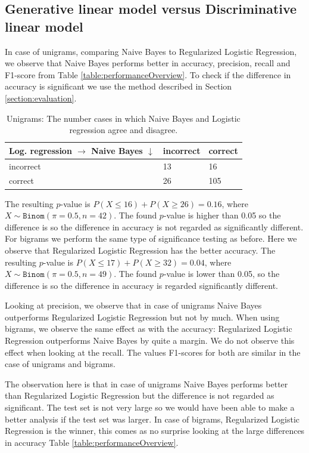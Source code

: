 \documentclass[a4paper,11pt]{article}
\begin{document}
\subsection{Generative linear model versus Discriminative linear model}
In case of unigrams, comparing Naive Bayes to Regularized Logistic Regression, we observe that Naive Bayes performs better in accuracy, precision, recall and F1-score from Table \ref{table:performanceOverview}. To check if the difference in accuracy is significant we use the method described in Section \ref{section:evaluation}. 
\begin{table}[H]
\centering
\caption{Unigrams: The number cases in which Naive Bayes and Logistic regression agree and disagree.}
\label{table:NBLogUni}
\begin{tabular}{|l|l|l|}
\hline
\shortstack{Log. regression $\rightarrow$ \\ Naive Bayes $\downarrow$} & incorrect & correct \\
\hline
incorrect   & 13   & 16    \\
correct & 26   & 105     \\
\hline
\end{tabular}
\end{table}
The resulting $p$-value is $P(X \leq 16) + P(X \geq 26) = 0.16$, where $X \sim \texttt{Binom}(\pi = 0.5, n = 42)$. The found $p$-value is higher than 0.05 so the difference is so the difference in accuracy is not regarded as significantly different. For bigrams we perform the same type of significance testing as before. Here we observe that Regularized Logistic Regression has the better accuracy. The resulting $p$-value is $P(X \leq 17) + P(X \geq 32) = 0.04$, where $X \sim \texttt{Binom}(\pi = 0.5, n = 49)$. The found $p$-value is lower than 0.05, so the difference is so the difference in accuracy is regarded significantly different. 

Looking at precision, we observe that in case of unigrams Naive Bayes outperforms Regularized Logistic Regression but not by much. When using bigrams, we observe the same effect as with the accuracy: Regularized Logistic Regression outperforms Naive Bayes by quite a margin. We do not observe this effect when looking at the recall. The values F1-scores for both are similar in the case of unigrams and bigrams. 

The observation here is that in case of unigrams Naive Bayes performs better than Regularized Logistic Regression but the difference is not regarded as significant. The test set is not very large so we would have been able to make a better analysis if the test set was larger. In case of bigrams, Regularized Logistic Regression is the winner, this comes as no surprise looking at the large differences in accuracy Table \ref{table:performanceOverview}.
\end{document}
